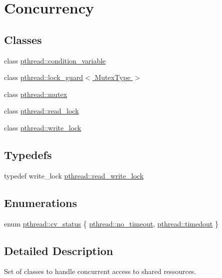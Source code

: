 \hypertarget{group__concurrency}{\section{Concurrency}
\label{group__concurrency}
}
\subsection*{Classes}
\begin{DoxyCompactItemize}
\item 
class \hyperlink{classpthread_1_1condition__variable}{pthread\+::condition\+\_\+variable}
\item 
class \hyperlink{classpthread_1_1lock__guard}{pthread\+::lock\+\_\+guard$<$ Mutex\+Type $>$}
\item 
class \hyperlink{classpthread_1_1mutex}{pthread\+::mutex}
\item 
class \hyperlink{classpthread_1_1read__lock}{pthread\+::read\+\_\+lock}
\item 
class \hyperlink{classpthread_1_1write__lock}{pthread\+::write\+\_\+lock}
\end{DoxyCompactItemize}
\subsection*{Typedefs}
\begin{DoxyCompactItemize}
\item 
typedef write\+\_\+lock \hyperlink{group__concurrency_ga067fcec8c2b20e2e487c123c2f82d2df}{pthread\+::read\+\_\+write\+\_\+lock}
\end{DoxyCompactItemize}
\subsection*{Enumerations}
\begin{DoxyCompactItemize}
\item 
enum \hyperlink{group__concurrency_ga823f88a2bf448bd5bd5273b826830bdd}{pthread\+::cv\+\_\+status} \{ \hyperlink{group__concurrency_gga823f88a2bf448bd5bd5273b826830bdda633b1bc5140f77a22f2c26bea4fa3398}{pthread\+::no\+\_\+timeout}, 
\hyperlink{group__concurrency_gga823f88a2bf448bd5bd5273b826830bdda1c2d3e88a4ad820053c817753867b31a}{pthread\+::timedout}
 \}
\end{DoxyCompactItemize}


\subsection{Detailed Description}
Set of classes to handle concurrent access to shared ressources.

